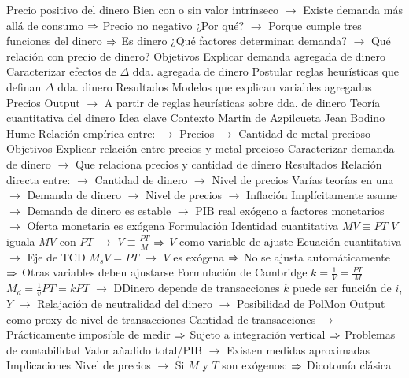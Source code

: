 \documentclass{nuevotema}
\begin{document}
\begin{esquemal}
				\4 Precio positivo del dinero
				\4[] Bien con o sin valor intrínseco
				\4[] $\to$ Existe demanda más allá de consumo
				\4[] $\Rightarrow$ Precio no negativo
				\4[] ¿Por qué?
				\4[] $\to$ Porque cumple tres funciones del dinero
				\4[] $\Rightarrow$ Es dinero
				\4[] ¿Qué factores determinan demanda?
				\4[] $\to$ Qué relación con precio de dinero?
			\3 Objetivos
				\4 Explicar demanda agregada de dinero
				\4 Caracterizar efectos de $\Delta$ dda. agregada de dinero
				\4 Postular reglas heurísticas que definan $\Delta$ dda. dinero
			\3 Resultados
				\4 Modelos que explican variables agregadas
				\4[] Precios
				\4[] Output
				\4[] $\to$ A partir de reglas heurísticas sobre dda. de dinero
		\2 Teoría cuantitativa del dinero
			\3 Idea clave
				\4 Contexto
				\4[] Martin de Azpilcueta
				\4[] Jean Bodino
				\4[] Hume
				\4[] Relación empírica entre:
				\4[] $\to$ Precios
				\4[] $\to$ Cantidad de metal precioso
				\4 Objetivos
				\4[] Explicar relación entre precios y metal precioso
				\4[] Caracterizar demanda de dinero
				\4[] $\to$ Que relaciona precios y cantidad de dinero
				\4 Resultados
				\4[] Relación directa entre:
				\4[] $\to$ Cantidad de dinero
				\4[] $\to$ Nivel de precios
				\4[] Varías teorías en una
				\4[] $\to$ Demanda de dinero
				\4[] $\to$ Nivel de precios
				\4[] $\to$ Inflación
				\4[] Implícitamente asume
				\4[] $\to$ Demanda de dinero es estable
				\4[] $\to$ PIB real exógeno a factores monetarios
				\4[] $\to$ Oferta monetaria es exógena
			\3 Formulación
				\4 Identidad cuantitativa
				\4[] $MV \equiv PT$
				\4[] $V$ iguala $MV$ con $PT$
				\4[] $\to$ $V \equiv \frac{PT}{M}$
				\4[] $\Rightarrow$ $V$ como variable de ajuste
				\4 Ecuación cuantitativa $\to$ Eje de TCD
				\4[] $M_s V = PT$
				\4[] $\to$ $V$ es exógena
				\4[] $\Rightarrow$ No se ajusta automáticamente
				\4[] $\Rightarrow$ Otras variables deben ajustarse
				\4 Formulación de Cambridge
				\4[] $k = \frac{1}{V} = \frac{PT}{M}$
				\4[] $M_d = \frac{1}{v} PT = k PT$
				\4[] $\to$ DDinero depende de transacciones
				\4[] $k$ puede ser función de $i$, $Y$
				\4[] $\to$ Relajación de neutralidad del dinero
				\4[] $\to$ Posibilidad de PolMon
				\4 Output como proxy de nivel de transacciones
				\4[] Cantidad de transacciones
				\4[] $\to$ Prácticamente imposible de medir
				\4[] $\Rightarrow$ Sujeto a integración vertical
				\4[] $\Rightarrow$ Problemas de contabilidad
				\4[] Valor añadido total/PIB
				\4[] $\to$ Existen medidas aproximadas
			\3 Implicaciones
				\4 Nivel de precios
				\4[] $\to$ Si $M$ y $T$ son exógenos:
				\4[] $\Rightarrow$ Dicotomía clásica

\end{esquemal}
\end{document}
